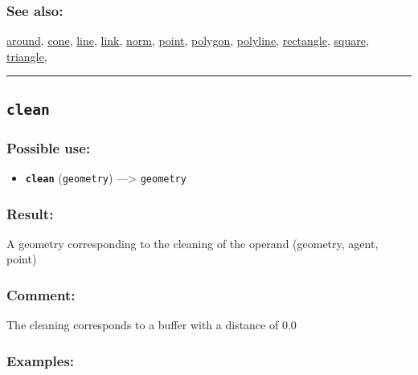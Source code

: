 \documentclass[]{book}
\providecommand{\tightlist}{%
  \setlength{\itemsep}{0pt}\setlength{\parskip}{0pt}}
\theoremstyle{definition}
\theoremstyle{definition}
\theoremstyle{definition}
\theoremstyle{remark}
\begin{document}
\subsubsection{See also:}\label{see-also-52}

\href{OperatorsAA\#around}{around}, \href{OperatorsBC\#cone}{cone},
\href{OperatorsIM\#line}{line}, \href{OperatorsIM\#link}{link},
\href{OperatorsNR\#norm}{norm}, \href{OperatorsNR\#point}{point},
\href{OperatorsNR\#polygon}{polygon},
\href{OperatorsNR\#polyline}{polyline},
\href{OperatorsNR\#rectangle}{rectangle},
\href{OperatorsSZ\#square}{square},
\href{OperatorsSZ\#triangle}{triangle},

\begin{center}\rule{0.5\linewidth}{\linethickness}\end{center}

\subsection{\texorpdfstring{\texttt{clean}}{clean}}\label{clean}

\subsubsection{Possible use:}\label{possible-use-86}

\begin{itemize}
\tightlist
\item
  \textbf{\texttt{clean}} (\texttt{geometry}) ---\textgreater{}
  \texttt{geometry}
\end{itemize}

\subsubsection{Result:}\label{result-84}

A geometry corresponding to the cleaning of the operand (geometry,
agent, point)

\subsubsection{Comment:}\label{comment-18}

The cleaning corresponds to a buffer with a distance of 0.0

\subsubsection{Examples:}\label{examples-65}
\end{document}
